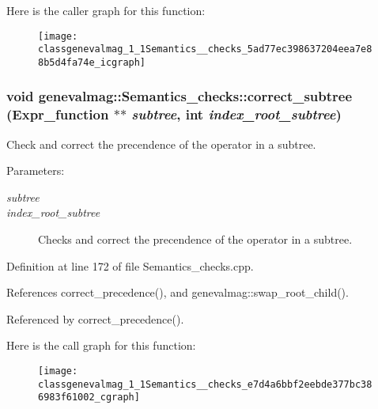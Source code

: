 Here is the caller graph for this function:\nopagebreak
\begin{figure}[H]
\begin{center}
\leavevmode
\texttt{[image: classgenevalmag\_1\_1Semantics\_\_checks\_5ad77ec398637204eea7e88b5d4fa74e\_icgraph]}
\end{center}
\end{figure}
\hypertarget{classgenevalmag_1_1Semantics__checks_e7d4a6bbf2eebde377bc386983f61002}{
\subsubsection[{correct\_\-subtree}]{\setlength{\rightskip}{0pt plus 5cm}void genevalmag::Semantics\_\-checks::correct\_\-subtree ({\bf Expr\_\-function} $\ast$$\ast$ {\em subtree}, \/  int {\em index\_\-root\_\-subtree})}}
\label{classgenevalmag_1_1Semantics__checks_e7d4a6bbf2eebde377bc386983f61002}


Check and correct the precendence of the operator in a subtree. \begin{Desc}
\item[Parameters:]
\begin{description}
\item[{\em subtree}]\item[{\em index\_\-root\_\-subtree}]Checks and correct the precendence of the operator in a subtree. \end{description}
\end{Desc}


Definition at line 172 of file Semantics\_\-checks.cpp.

References correct\_\-precedence(), and genevalmag::swap\_\-root\_\-child().

Referenced by correct\_\-precedence().

Here is the call graph for this function:\nopagebreak
\begin{figure}[H]
\begin{center}
\leavevmode
\texttt{[image: classgenevalmag\_1\_1Semantics\_\_checks\_e7d4a6bbf2eebde377bc386983f61002\_cgraph]}
\end{center}
\end{figure}



